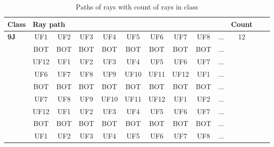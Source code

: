 \begin{table}[h!]
\centering
\begin{tabular}{|l|c|c|c|c|c|c|c|c|c|c|c|c|}
\hline
Class &  \multicolumn{9}{l}{Ray path} \vline  & Count\\
\hline \hline
\textbf{9J} & UF1 & UF2 & UF3 & UF4 & UF5 & UF6 & UF7 & UF8 & $\dots$ & 12\\
 & BOT & BOT & BOT & BOT & BOT & BOT & BOT & BOT & $\dots$ & \\
 & UF12 & UF1 & UF2 & UF3 & UF4 & UF5 & UF6 & UF7 & $\dots$ & \\
 & UF6 & UF7 & UF8 & UF9 & UF10 & UF11 & UF12 & UF1 & $\dots$ & \\
 & BOT & BOT & BOT & BOT & BOT & BOT & BOT & BOT & $\dots$ & \\
 & UF7 & UF8 & UF9 & UF10 & UF11 & UF12 & UF1 & UF2 & $\dots$ & \\
 & UF12 & UF1 & UF2 & UF3 & UF4 & UF5 & UF6 & UF7 & $\dots$ & \\
 & BOT & BOT & BOT & BOT & BOT & BOT & BOT & BOT & $\dots$ & \\
 & UF1 & UF2 & UF3 & UF4 & UF5 & UF6 & UF7 & UF8 & $\dots$ & \\
\hline 
\end{tabular}
\caption{Paths of rays with count of rays in class }
\label{table:TableClasses6}
\end{table}